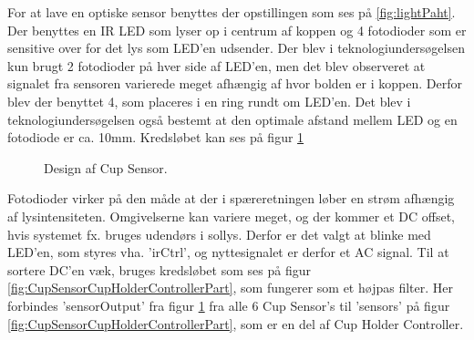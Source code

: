 \documentclass[Rapport/Rapport_main.tex]{subfiles}
\begin{document}
For at lave en optiske sensor benyttes der opstillingen som ses på \ref{fig:lightPaht}. Der benyttes en IR LED som lyser op i centrum af koppen og 4 fotodioder som er sensitive over for det lys som LED'en udsender. Der blev i teknologiundersøgelsen kun brugt 2 fotodioder på hver side af LED'en, men det blev observeret at signalet fra sensoren varierede meget afhængig af hvor bolden er i koppen. Derfor blev der benyttet 4, som placeres i en ring rundt om LED'en. Det blev i teknologiundersøgelsen også bestemt at den optimale afstand mellem LED og en fotodiode er ca. 10mm. Kredsløbet kan ses på figur \ref{fig:CupSensorDesign}  
\begin{figure}[H]
    \centering
    \caption{Design af Cup Sensor.}
    \label{fig:CupSensorDesign}
\end{figure}
Fotodioder virker på den måde at der i spæreretningen løber en strøm afhængig af lysintensiteten. Omgivelserne kan variere meget, og der kommer et DC offset, hvis systemet fx. bruges udendørs i sollys. Derfor er det valgt at blinke med LED'en, som styres vha. 'irCtrl', og nyttesignalet er derfor et AC signal. Til at sortere DC'en væk, bruges kredsløbet som ses på figur \ref{fig:CupSensorCupHolderControllerPart}, som fungerer som et højpas filter. Her forbindes 'sensorOutput' fra figur \ref{fig:CupSensorDesign} fra alle 6 Cup Sensor's til 'sensors' på figur \ref{fig:CupSensorCupHolderControllerPart}, som er en del af Cup Holder Controller. 
\end{document}

